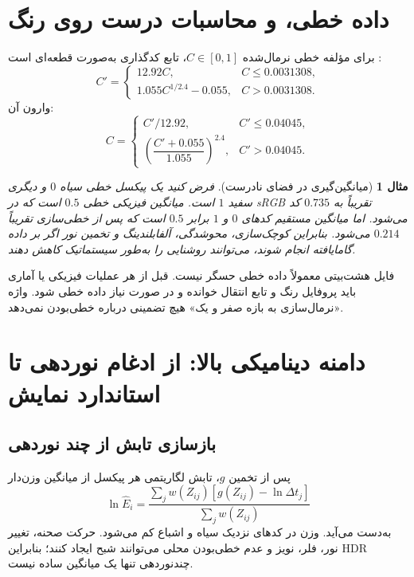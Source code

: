 \documentclass[12pt,openany,oneside]{book}
\newtheorem{example}{مثال}[chapter]
\begin{document}
\section{داده خطی،  و محاسبات درست روی رنگ}

برای مؤلفه خطی نرمال‌شده \(C\in[0,1]\)، تابع کدگذاری  به‌صورت قطعه‌ای است
\cite{iec61966srgb}:
\begin{equation}
C'=
\begin{cases}
12.92C,&C\le0.0031308,\\
1.055C^{1/2.4}-0.055,&C>0.0031308.
\end{cases}
\label{eq:srgb-oetf}
\end{equation}
وارون آن:
\begin{equation}
C=
\begin{cases}
C'/12.92,&C'\le0.04045,\\
\left(\dfrac{C'+0.055}{1.055}\right)^{2.4},&C'>0.04045.
\end{cases}
\label{eq:srgb-inverse}
\end{equation}

\begin{example}[میانگین‌گیری در فضای نادرست]
فرض کنید یک پیکسل خطی سیاه \(0\) و دیگری سفید \(1\) است. میانگین فیزیکی خطی \(0.5\) است که در
sRGB تقریباً به \(0.735\) کد می‌شود. اما میانگین مستقیم کدهای \(0\) و \(1\) برابر \(0.5\) است که
پس از خطی‌سازی تقریباً \(0.214\) می‌شود. بنابراین کوچک‌سازی، محوشدگی، آلفا‌بلندینگ و تخمین نور
اگر بر داده گامایافته انجام شوند، می‌توانند روشنایی را به‌طور سیستماتیک کاهش دهند.
\end{example}

\begin{warningbox}
فایل هشت‌بیتی  معمولاً داده خطی حسگر نیست. قبل از هر عملیات فیزیکی یا آماری باید
پروفایل رنگ و تابع انتقال خوانده و در صورت نیاز داده خطی شود. واژه «نرمال‌سازی به بازه صفر و یک»
هیچ تضمینی درباره خطی‌بودن نمی‌دهد.
\end{warningbox}

\section{دامنه دینامیکی بالا: از ادغام نوردهی تا استاندارد نمایش}

\subsection{بازسازی تابش از چند نوردهی}

پس از تخمین \(g\)، تابش لگاریتمی هر پیکسل از میانگین وزن‌دار
\begin{equation}
\ln\widehat E_i=
\frac{\sum_j w(Z_{ij})[g(Z_{ij})-\ln\Delta t_j]}
{\sum_j w(Z_{ij})}
\label{eq:hdr-radiance}
\end{equation}
به‌دست می‌آید. وزن در کدهای نزدیک سیاه و اشباع کم می‌شود. حرکت صحنه، تغییر نور، فلر، نویز و
عدم خطی‌بودن محلی می‌توانند شبح ایجاد کنند؛ بنابراین HDR چندنوردهی تنها یک میانگین ساده نیست.
\end{document}
